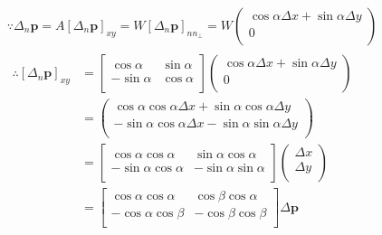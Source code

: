 \begin{align*}
&\because \Delta _n\boldsymbol{p}=A\left[ \Delta _n\boldsymbol{p} \right] _{xy}=W\left[ \Delta _n\boldsymbol{p} \right] _{nn_{\bot}}=W\left( \begin{array}{c}
	\cos \alpha \Delta x+\sin \alpha \Delta y\\
	0\\
\end{array} \right) \\
&\begin{aligned}
	\therefore \left[ \Delta _n\boldsymbol{p} \right] _{xy}&=\left[ \begin{matrix}
	\cos \alpha&		\sin \alpha\\
	-\sin \alpha&		\cos \alpha\\
\end{matrix} \right] \left( \begin{array}{c}
	\cos \alpha \Delta x+\sin \alpha \Delta y\\
	0\\
\end{array} \right)\\
    &=\left( \begin{array}{c}
	\cos \alpha \cos \alpha \Delta x+\sin \alpha \cos \alpha \Delta y\\
	-\sin \alpha \cos \alpha \Delta x-\sin \alpha \sin \alpha \Delta y\\
\end{array} \right)\\
	&=\left[ \begin{matrix}
	\cos \alpha \cos \alpha&		\sin \alpha \cos \alpha\\
	-\sin \alpha \cos \alpha&		-\sin \alpha \sin \alpha\\
\end{matrix} \right] \left( \begin{array}{c}
	\Delta x\\
	\Delta y\\
\end{array} \right)\\
	&=\left[ \begin{matrix}
	\cos \alpha \cos \alpha&		\cos \beta \cos \alpha\\
	-\cos \alpha \cos \beta&		-\cos \beta \cos \beta\\
\end{matrix} \right] \Delta \boldsymbol{p}\\
\end{aligned}
\end{align*}

